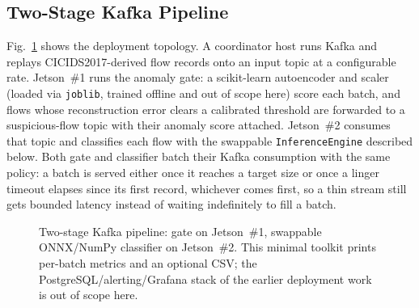 \documentclass[runningheads]{llncs}
\begin{document}
\subsection{Two-Stage Kafka Pipeline}

Fig.~\ref{fig:architecture} shows the deployment topology. A coordinator host runs Kafka and replays CICIDS2017-derived flow records onto an input topic at a configurable rate. Jetson~\#1 runs the anomaly gate: a scikit-learn autoencoder and scaler (loaded via \texttt{joblib}, trained offline and out of scope here) score each batch, and flows whose reconstruction error clears a calibrated threshold are forwarded to a suspicious-flow topic with their anomaly score attached. Jetson~\#2 consumes that topic and classifies each flow with the swappable \texttt{InferenceEngine} described below. Both gate and classifier batch their Kafka consumption with the same policy: a batch is served either once it reaches a target size or once a linger timeout elapses since its first record, whichever comes first, so a thin stream still gets bounded latency instead of waiting indefinitely to fill a batch.

\begin{figure}[t]
  \centering
  \caption{Two-stage Kafka pipeline: gate on Jetson~\#1, swappable ONNX/NumPy classifier on Jetson~\#2. This minimal toolkit prints per-batch metrics and an optional CSV; the PostgreSQL/alerting/Grafana stack of the earlier deployment work is out of scope here.}
  \label{fig:architecture}
\end{figure}
\end{document}
